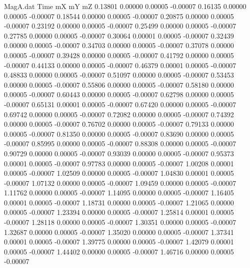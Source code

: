 \begin{filecontents}{MagA.dat}
Time mX mY mZ
   0.13801    0.00000    0.00005   -0.00007
   0.16135    0.00000    0.00005   -0.00007
   0.18544    0.00000    0.00005   -0.00007
   0.20875    0.00000    0.00005   -0.00007
   0.23192    0.00000    0.00005   -0.00007
   0.25499    0.00000    0.00005   -0.00007
   0.27785    0.00000    0.00005   -0.00007
   0.30064    0.00001    0.00005   -0.00007
   0.32439    0.00000    0.00005   -0.00007
   0.34703    0.00000    0.00005   -0.00007
   0.37078    0.00000    0.00005   -0.00007
   0.39428    0.00000    0.00005   -0.00007
   0.41792    0.00000    0.00005   -0.00007
   0.44133    0.00000    0.00005   -0.00007
   0.46379    0.00001    0.00005   -0.00007
   0.48833    0.00000    0.00005   -0.00007
   0.51097    0.00000    0.00005   -0.00007
   0.53453    0.00000    0.00005   -0.00007
   0.55806    0.00000    0.00005   -0.00007
   0.58180    0.00000    0.00005   -0.00007
   0.60443    0.00000    0.00005   -0.00007
   0.62798    0.00000    0.00005   -0.00007
   0.65131    0.00001    0.00005   -0.00007
   0.67420    0.00000    0.00005   -0.00007
   0.69742    0.00000    0.00005   -0.00007
   0.72082    0.00000    0.00005   -0.00007
   0.74392    0.00000    0.00005   -0.00007
   0.76702    0.00000    0.00005   -0.00007
   0.79133    0.00000    0.00005   -0.00007
   0.81350    0.00000    0.00005   -0.00007
   0.83690    0.00000    0.00005   -0.00007
   0.85995    0.00000    0.00005   -0.00007
   0.88308    0.00000    0.00005   -0.00007
   0.90729    0.00000    0.00005   -0.00007
   0.93039    0.00000    0.00005   -0.00007
   0.95373    0.00001    0.00005   -0.00007
   0.97783    0.00000    0.00005   -0.00007
   1.00208    0.00001    0.00005   -0.00007
   1.02509    0.00000    0.00005   -0.00007
   1.04830    0.00001    0.00005   -0.00007
   1.07132    0.00000    0.00005   -0.00007
   1.09459    0.00000    0.00005   -0.00007
   1.11762    0.00000    0.00005   -0.00007
   1.14095    0.00000    0.00005   -0.00007
   1.16405    0.00001    0.00005   -0.00007
   1.18731    0.00000    0.00005   -0.00007
   1.21065    0.00000    0.00005   -0.00007
   1.23394    0.00000    0.00005   -0.00007
   1.25814    0.00001    0.00005   -0.00007
   1.28118    0.00000    0.00005   -0.00007
   1.30351    0.00000    0.00005   -0.00007
   1.32687    0.00000    0.00005   -0.00007
   1.35020    0.00000    0.00005   -0.00007
   1.37341    0.00001    0.00005   -0.00007
   1.39775    0.00000    0.00005   -0.00007
   1.42079    0.00001    0.00005   -0.00007
   1.44402    0.00000    0.00005   -0.00007
   1.46716    0.00000    0.00005   -0.00007

\end{filecontents}
